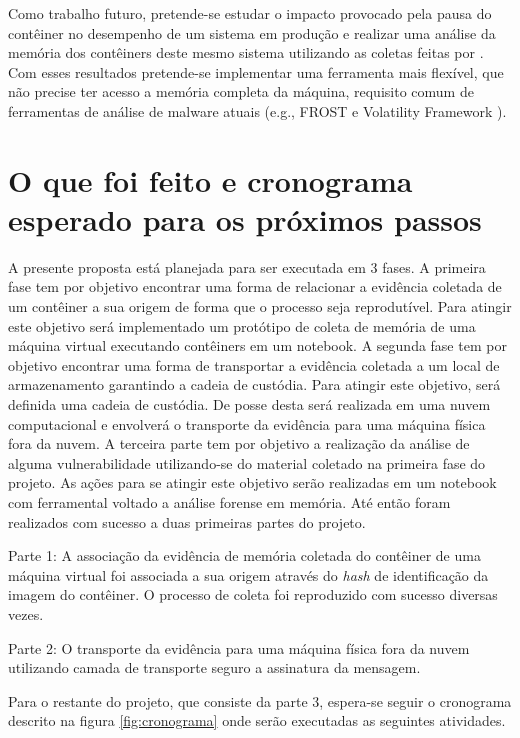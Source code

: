 Como trabalho futuro, pretende-se estudar o impacto provocado pela pausa do contêiner no desempenho de um sistema em produção e realizar uma análise da memória dos contêiners deste mesmo sistema utilizando as coletas feitas por \fancyname. 
%
Com esses resultados pretende-se implementar uma ferramenta mais flexível, que não precise ter acesso a memória completa da máquina, requisito comum de ferramentas de análise de malware atuais (e.g., FROST \cite{DykstraFROST:2013} e Volatility Framework \cite{VolatilityFoundation2014}).


\section{O que foi feito e cronograma esperado para os próximos passos}
\label{sec:proposta-prox}

A presente proposta está planejada para ser executada em 3 fases.
%
A primeira fase tem por objetivo encontrar uma forma de relacionar a evidência coletada de um contêiner a sua origem de forma que o processo seja reprodutível. 
%
Para atingir este objetivo será implementado um protótipo de coleta de memória de uma máquina virtual executando contêiners em um notebook.
%
A segunda fase tem por objetivo encontrar uma forma de transportar a evidência coletada a um local de armazenamento garantindo a cadeia de custódia.
%
Para atingir este objetivo, será definida uma cadeia de custódia. De posse desta será realizada em uma nuvem computacional e envolverá o transporte da evidência para uma máquina física fora da nuvem.
%
A terceira parte tem por objetivo a realização da análise de alguma vulnerabilidade utilizando-se do material coletado na primeira fase do projeto.
%
As ações para se atingir este objetivo serão realizadas em um notebook com ferramental voltado a análise forense em memória.
%
Até então foram realizados com sucesso a duas primeiras partes do projeto.

%
Parte 1: A associação da evidência de memória coletada do contêiner de uma máquina virtual foi associada a sua origem através do \textit{hash} de identificação da imagem do contêiner. O processo de coleta foi reproduzido com sucesso diversas vezes.
%

Parte 2: O transporte da evidência para uma máquina física fora da nuvem utilizando camada de transporte seguro a assinatura da mensagem.
%

Para o restante do projeto, que consiste da parte 3, espera-se seguir o cronograma descrito na figura \ref{fig:cronograma} onde serão executadas as seguintes atividades.

